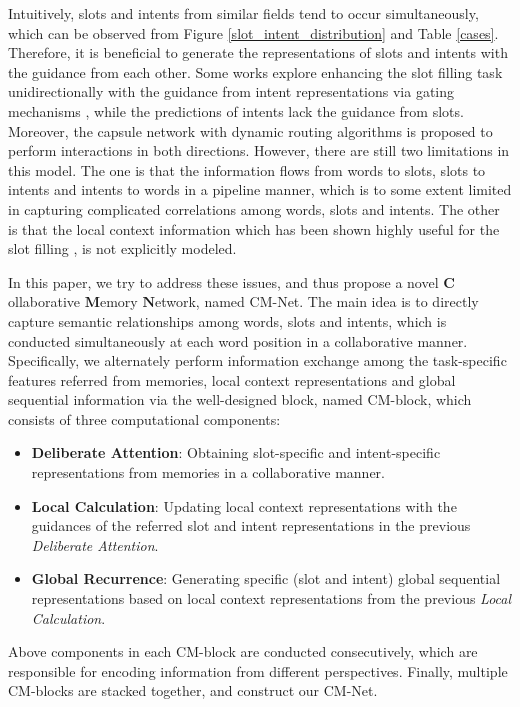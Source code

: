 \documentclass[11pt,a4paper]{article}
\begin{document}
Intuitively, slots and intents from similar fields tend to occur simultaneously, which can be observed from Figure \ref{slot_intent_distribution} and Table \ref{cases}. 
Therefore, it is beneficial to generate the representations of slots and intents with the guidance from each other.
Some works explore enhancing the slot filling task unidirectionally with the guidance from intent representations via gating mechanisms \cite{slot_gated_2018, self_attentive_2018}, while the predictions of intents lack the guidance from slots.
Moreover, the capsule network with dynamic routing algorithms \cite{capsule_2018} is proposed to perform interactions in both directions. However, there are still two limitations in this model. The one is that the information flows from words to slots, slots to intents and intents to words in a pipeline manner, which is to some extent limited in capturing complicated correlations among words, slots and intents. 
The other is that the local context information which has been shown highly useful for the slot filling \cite{local_window_2014}, is not explicitly modeled.


In this paper, we try to address these issues, and thus propose a novel $\mathbf{C}$ollaborative $\mathbf{M}$emory $\mathbf{N}$etwork, named CM-Net. The main idea is to directly capture semantic relationships among words, slots and intents, which is conducted simultaneously at each word position in a collaborative manner. Specifically, we alternately perform information exchange among the task-specific features referred from memories, local context representations and global sequential information via the well-designed block, named CM-block, which consists of three computational components: 
\begin{itemize}
\item \textbf{Deliberate Attention}: 
Obtaining slot-specific and intent-specific representations from memories in a collaborative manner. 


\item \textbf{Local Calculation}: 
Updating local context representations with the guidances of the referred slot and intent representations in the previous \emph{Deliberate Attention}. \vspace{-3pt}
\item \textbf{Global Recurrence}: Generating specific (slot and intent) global sequential representations based on local context representations
from the previous \emph{Local Calculation}.
\end{itemize}
Above components in each CM-block are conducted consecutively, which are responsible for encoding information from different perspectives.
Finally, multiple CM-blocks are stacked together, and  construct our CM-Net. 
\end{document}
